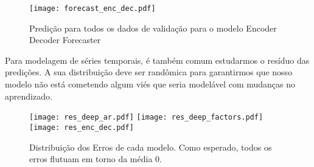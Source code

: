 \begin{figure}[H]
  \label{fig:forencdec}
  \centering
\texttt{[image: forecast\_enc\_dec.pdf]} 
\caption{Predição para todos os dados de validação para o modelo Encoder Decoder Forecaster} 
\end{figure}


Para modelagem de séries temporais, é também comum estudarmos o resíduo das predições. A sua distribuição deve ser randômica para garantirmos que nosso modelo não está cometendo algum viés que seria
modelável com mudanças no aprendizado. \\


\begin{figure}[H]
\label{fig:distr}
\centering
\texttt{[image: res\_deep\_ar.pdf]} \hfill
\texttt{[image: res\_deep\_factors.pdf]} \hfill
\texttt{[image: res\_enc\_dec.pdf]} 
\caption{Distribuição dos Erros de cada modelo. Como esperado, todos os erros flutuam em torno da média 0. } 
\end{figure}



